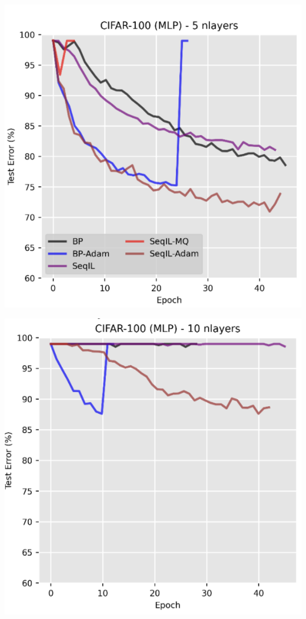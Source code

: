 \documentclass{article}
\theoremstyle{plain}
\theoremstyle{definition}
\theoremstyle{remark}
\begin{document}
\centerline{\includegraphics[width=\columnwidth, height = 0.3\paperheight]{images/cifar_mlp_1_5.png}}
\centerline{\includegraphics[width=\columnwidth, height = 0.3\paperheight]{images/cifar_mlp_1_10.png}}
\end{document}
